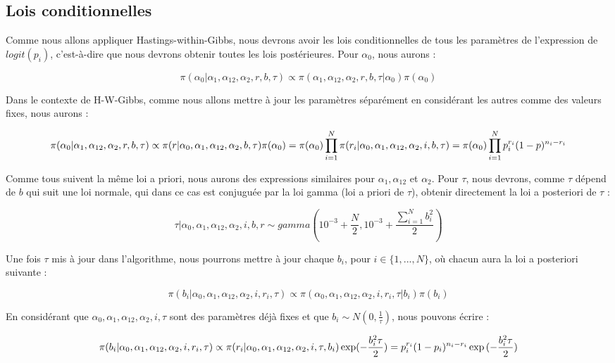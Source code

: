 \documentclass[
]{article}
\begin{document}
\hypertarget{lois-conditionnelles}{%
\subsection{Lois conditionnelles}\label{lois-conditionnelles}}

Comme nous allons appliquer Hastings-within-Gibbs, nous devrons avoir
les lois conditionnelles de tous les paramètres de l'expression de
\(logit(p_i)\), c'est-à-dire que nous devrons obtenir toutes les lois
postérieures. Pour \(\alpha_0\), nous aurons :

\[
  \pi(\alpha_0|\alpha_1, \alpha_{12}, \alpha_2, r, b, \tau) \propto \pi(\alpha_1, \alpha_{12}, \alpha_2, r, b, \tau|\alpha_0)\pi(\alpha_0)
\]

Dans le contexte de H-W-Gibbs, comme nous allons mettre à jour les
paramètres séparément en considérant les autres comme des valeurs fixes,
nous aurons :

\[
    \pi(\alpha_0|\alpha_1, \alpha_{12}, \alpha_2, r, b, \tau) \propto \pi(r|\alpha_0,\alpha_1, \alpha_{12}, \alpha_2, b, \tau)\pi(\alpha_0)\\ =  \pi(\alpha_0)\prod_{i=1}^N\pi(r_i|\alpha_0,\alpha_1, \alpha_{12}, \alpha_2, i,b, \tau)\\ = \pi(\alpha_0)\prod_{i=1}^Np_i^{r_i}(1-p)^{n_i - r_i}
\]

Comme tous suivent la même loi a priori, nous aurons des expressions
similaires pour \(\alpha_1, \alpha_{12}\) et \(\alpha_2\). Pour
\(\tau\), nous devrons, comme \(\tau\) dépend de \(b\) qui suit une loi
normale, qui dans ce cas est conjuguée par la loi gamma (loi a priori de
\(\tau\)), obtenir directement la loi a posteriori de \(\tau\) :

\[
  \tau|\alpha_0, \alpha_{1}, \alpha_{12},\alpha_2, i , b, r \sim gamma(10^{-3} + \frac{N}{2}, 10^{-3} + \frac{\sum_{i=1}^Nb_i^2}{2})
\]

Une fois \(\tau\) mis à jour dans l'algorithme, nous pourrons mettre à
jour chaque \(b_i\), pour \(i \in \{1, ..., N\}\), où chacun aura la loi
a posteriori suivante :

\[
  \pi(b_i| \alpha_0, \alpha_{1}, \alpha_{12},\alpha_2, i , r_i, \tau) \propto \pi( \alpha_0, \alpha_{1}, \alpha_{12},\alpha_2, i , r_i, \tau| b_i)\pi(b_i)
\]

En considérant que
\(\alpha_0, \alpha_{1}, \alpha_{12},\alpha_2, i, \tau\) sont des
paramètres déjà fixes et que \(b_i \sim N(0,\frac{1}{\tau})\), nous
pouvons écrire :

\[
  \pi(b_i| \alpha_0, \alpha_{1}, \alpha_{12},\alpha_2, i , r_i, \tau) \propto \pi(r_i|\alpha_0, \alpha_{1}, \alpha_{12},\alpha_2, i , \tau, b_i)\exp(-\frac{b_i^2\tau}{2}) \\
  =p_i^{r_i}(1-p_i)^{n_i-r_i}\exp{(-\frac{b_i^2\tau}{2})}
\]
\end{document}
